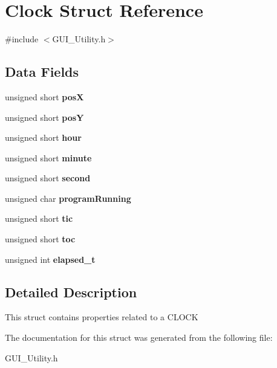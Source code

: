 \hypertarget{struct_clock}{}\section{Clock Struct Reference}
\label{struct_clock}


{\ttfamily \#include $<$G\+U\+I\+\_\+\+Utility.\+h$>$}

\subsection*{Data Fields}
\begin{DoxyCompactItemize}
\item 
\mbox{\label{struct_clock_acf82b1f383f9d48285b4db20bfadaeab}} 
unsigned short {\bfseries posX}
\item 
\mbox{\label{struct_clock_a3d97dccc2996193d66791323db9038a1}} 
unsigned short {\bfseries posY}
\item 
\mbox{\label{struct_clock_a8e30e2c31a49a3c3b428cbf5263d7cce}} 
unsigned short {\bfseries hour}
\item 
\mbox{\label{struct_clock_aef1d9fa65c4545d458b22fb29c3abd1e}} 
unsigned short {\bfseries minute}
\item 
\mbox{\label{struct_clock_add792b6b7b67f35d5295c0326e2a408a}} 
unsigned short {\bfseries second}
\item 
\mbox{\label{struct_clock_a9c8421870191c4bc880bd087960a5023}} 
unsigned char {\bfseries program\+Running}
\item 
\mbox{\label{struct_clock_a9df4652e673a02227d07a2ab8af33da2}} 
unsigned short {\bfseries tic}
\item 
\mbox{\label{struct_clock_a85f075927015eadfee96a9885b14f9ea}} 
unsigned short {\bfseries toc}
\item 
\mbox{\label{struct_clock_a375a63efaa649090d86beddeebc4f205}} 
unsigned int {\bfseries elapsed\+\_\+t}
\end{DoxyCompactItemize}


\subsection{Detailed Description}
This struct contains properties related to a C\+L\+O\+CK 

The documentation for this struct was generated from the following file\+:\begin{DoxyCompactItemize}
\item 
G\+U\+I\+\_\+\+Utility.\+h\end{DoxyCompactItemize}
